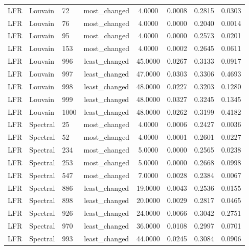 \begin{longtable}{lllccccc}
LFR & Louvain & 72 & most\_changed & 4.0000 & 0.0008 & 0.2815 & 0.0303 \\
LFR & Louvain & 76 & most\_changed & 4.0000 & 0.0000 & 0.2040 & 0.0014 \\
LFR & Louvain & 95 & most\_changed & 4.0000 & 0.0000 & 0.2573 & 0.0201 \\
LFR & Louvain & 153 & most\_changed & 4.0000 & 0.0002 & 0.2645 & 0.0611 \\
LFR & Louvain & 996 & least\_changed & 45.0000 & 0.0267 & 0.3133 & 0.0917 \\
LFR & Louvain & 997 & least\_changed & 47.0000 & 0.0303 & 0.3306 & 0.4693 \\
LFR & Louvain & 998 & least\_changed & 48.0000 & 0.0227 & 0.3203 & 0.1280 \\
LFR & Louvain & 999 & least\_changed & 48.0000 & 0.0327 & 0.3245 & 0.1345 \\
LFR & Louvain & 1000 & least\_changed & 48.0000 & 0.0262 & 0.3199 & 0.4182 \\
LFR & Spectral & 25 & most\_changed & 4.0000 & 0.0006 & 0.2427 & 0.0036 \\
LFR & Spectral & 52 & most\_changed & 4.0000 & 0.0001 & 0.2601 & 0.0227 \\
LFR & Spectral & 234 & most\_changed & 5.0000 & 0.0000 & 0.2565 & 0.0238 \\
LFR & Spectral & 253 & most\_changed & 5.0000 & 0.0000 & 0.2668 & 0.0998 \\
LFR & Spectral & 547 & most\_changed & 7.0000 & 0.0028 & 0.2384 & 0.0067 \\
LFR & Spectral & 886 & least\_changed & 19.0000 & 0.0043 & 0.2536 & 0.0155 \\
LFR & Spectral & 898 & least\_changed & 20.0000 & 0.0029 & 0.2817 & 0.0465 \\
LFR & Spectral & 926 & least\_changed & 24.0000 & 0.0066 & 0.3042 & 0.2751 \\
LFR & Spectral & 970 & least\_changed & 36.0000 & 0.0108 & 0.2997 & 0.0701 \\
LFR & Spectral & 993 & least\_changed & 44.0000 & 0.0245 & 0.3084 & 0.0906 \\
\end{longtable}